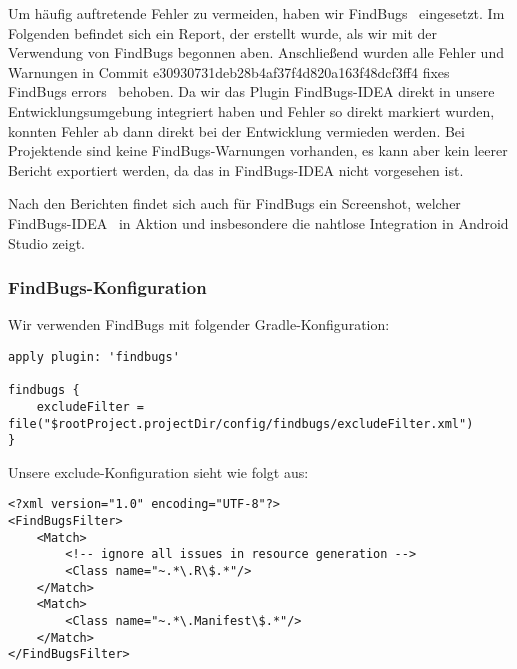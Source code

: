 
Um häufig auftretende Fehler zu vermeiden, haben wir \glqq FindBugs\grqq~ eingesetzt. Im Folgenden befindet sich ein Report, der erstellt wurde, als wir mit der Verwendung von FindBugs begonnen aben. Anschließend wurden alle Fehler und Warnungen in Commit e30930731deb28b4af37f4d820a163f48dcf3ff4 \glqq fixes FindBugs errors\grqq~ behoben. Da wir das Plugin FindBugs-IDEA direkt in unsere Entwicklungsumgebung integriert haben und Fehler so direkt markiert wurden, konnten Fehler ab dann direkt bei der Entwicklung vermieden werden. Bei Projektende sind keine FindBugs-Warnungen vorhanden, es kann aber kein leerer Bericht exportiert werden, da das in FindBugs-IDEA nicht vorgesehen ist.

Nach den Berichten findet sich auch für FindBugs ein Screenshot, welcher \glqq FindBugs-IDEA\grqq~ in Aktion und insbesondere die nahtlose Integration in Android Studio zeigt.

\subsubsection{FindBugs-Konfiguration}

Wir verwenden FindBugs mit folgender Gradle-Konfiguration:

\begin{lstlisting}
apply plugin: 'findbugs'

findbugs {
    excludeFilter = file("$rootProject.projectDir/config/findbugs/excludeFilter.xml")
}
\end{lstlisting}

Unsere exclude-Konfiguration sieht wie folgt aus:

\begin{lstlisting}
<?xml version="1.0" encoding="UTF-8"?>
<FindBugsFilter>
    <Match>
        <!-- ignore all issues in resource generation -->
        <Class name="~.*\.R\$.*"/>
    </Match>
    <Match>
        <Class name="~.*\.Manifest\$.*"/>
    </Match>
</FindBugsFilter>
\end{lstlisting}




